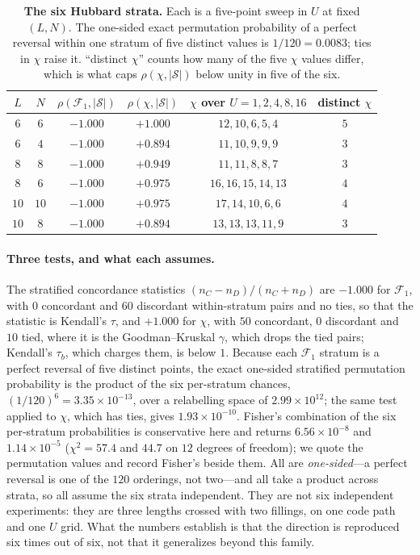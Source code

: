 \begin{table}[tp]\centering\small
\caption{\textbf{The six Hubbard strata.} Each is a five-point sweep in $U$ at fixed $(L,N)$. The
one-sided exact permutation probability of a perfect reversal within one stratum of five distinct
values is $1/120=0.0083$; ties in $\chi$ raise it. ``distinct $\chi$'' counts how many of the five
$\chi$ values differ, which is what caps $\rho(\chi,|\mathcal S|)$ below unity in five of the
six.}\label{tab:strata}
\begin{tabular}{cccccc}
\toprule
$L$ & $N$ & $\rho(\mathcal F_1,|\mathcal S|)$ & $\rho(\chi,|\mathcal S|)$ & $\chi$ over $U=1,2,4,8,16$ & distinct $\chi$\\
\midrule
$6$  & $6$  & $-1.000$ & $+1.000$ & $12,10,6,5,4$   & $5$\\
$6$  & $4$  & $-1.000$ & $+0.894$ & $11,10,9,9,9$   & $3$\\
$8$  & $8$  & $-1.000$ & $+0.949$ & $11,11,8,8,7$   & $3$\\
$8$  & $6$  & $-1.000$ & $+0.975$ & $16,16,15,14,13$& $4$\\
$10$ & $10$ & $-1.000$ & $+0.975$ & $17,14,10,6,6$  & $4$\\
$10$ & $8$  & $-1.000$ & $+0.894$ & $13,13,13,11,9$ & $3$\\
\bottomrule
\end{tabular}
\end{table}

\paragraph{Three tests, and what each assumes.} The stratified concordance statistics
$(n_C-n_D)/(n_C+n_D)$ are $-1.000$ for $\mathcal F_1$, with $0$ concordant and $60$ discordant
within-stratum pairs and no ties, so that the statistic is Kendall's $\tau$, and $+1.000$ for $\chi$,
with $50$ concordant, $0$ discordant and $10$ tied, where it is the Goodman--Kruskal $\gamma$, which
drops the tied pairs; Kendall's $\tau_b$, which charges them, is below $1$. Because each
$\mathcal F_1$ stratum is a perfect reversal of five distinct points, the exact one-sided stratified
permutation probability is the product of the six per-stratum chances,
$(1/120)^{6}=3.35\times10^{-13}$, over a relabelling space of $2.99\times10^{12}$; the same test
applied to $\chi$, which has ties, gives $1.93\times10^{-10}$. Fisher's combination of the six
per-stratum probabilities is conservative here and returns $6.56\times10^{-8}$ and
$1.14\times10^{-5}$ ($\chi^{2}=57.4$ and $44.7$ on $12$ degrees of freedom); we quote the permutation
values and record Fisher's beside them. All are \emph{one-sided}---a perfect reversal is one of the
$120$ orderings, not two---and all take a product across strata, so all assume the six strata
independent. They are not six independent experiments: they are three lengths crossed with two
fillings, on one code path and one $U$ grid. What the numbers establish is that the direction is
reproduced six times out of six, not that it generalizes beyond this family.

